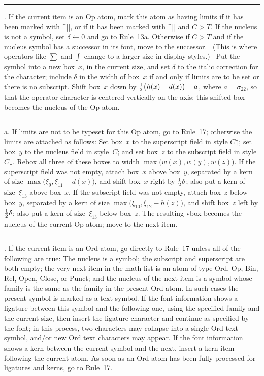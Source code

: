 \rule 13. If the current item is an Op atom, mark this atom as having
limits if it has been marked with ^|\limits|, or if it has been marked
with ^|\displaylimits| and $C>T$.  If the nucleus is not a symbol, set
$\delta\leftarrow0$ and go to Rule~13a. Otherwise if $C>T$ and if the
nucleus symbol has a successor in its font, move to the successor. \ (This
is where operators like $\sum$ and $\int$ change to a larger size in
display styles.) \ Put the symbol into a new box~$x$, in the current size,
and set $\delta$ to the italic correction for the character; include $\delta$
in the width of box~$x$ if and only if limits are to be set or
there is no subscript. Shift box~$x$ down by ${1\over2}\bigl(h(x)-d(x)\bigr)
-a$, where $a=\sigma_{22}$, so that the operator character is centered
vertically on the axis; this shifted box becomes the nucleus of the Op atom.

\rule 13a. If limits are not to be typeset for this Op atom, go to
Rule~17; otherwise the limits are attached as follows:
Set box~$x$ to the superscript field in style $C\mathord\uparrow$; set box~$y$
to the nucleus field in style~$C$; and set box~$z$ to the subscript field
in style $C\mathord\downarrow$. Rebox all three of these boxes to width
$\max\bigl(w(x),w(y),w(z)\bigr)$.  If the superscript field was not empty,
attach box~$x$ above box~$y$, separated by a kern of size
$\max\bigl(\xi_9,\xi_{11}-d(x)\bigr)$, and shift box~$x$ right by
${1\over2}\delta$; also put a kern of size~$\xi_{13}$ above box~$x$.
If the subscript field was not empty,
attach box~$z$ below box~$y$, separated by a kern of size
$\max\bigl(\xi_{10},\xi_{12}-h(z)\bigr)$, and shift box~$z$ left by
${1\over2}\delta$; also put a kern of size~$\xi_{13}$ below box~$z$.
The resulting vbox becomes the nucleus of the current Op atom; move to
the next item.

\rule 14. If the current item is an Ord atom, go directly to Rule~17 unless
all of the following are true: The nucleus is a symbol; the subscript
and superscript are both empty; the very next item in the math list is an
atom of type Ord, Op, Bin, Rel, Open, Close, or Punct; and the nucleus of the
next item is a symbol whose family is the same as the family in the present
Ord atom. In such cases the present symbol is marked as a text symbol.
If the font information shows a ligature between this symbol and the
following one, using the specified family and the current size, then
insert the ligature character and continue as specified by the font;
in this process, two characters may collapse into a single Ord
text symbol, and/or new Ord text characters may appear. If the font information
shows a kern between the current symbol and the next, insert a kern item
following the current atom.
As soon as an Ord atom has been fully processed for ligatures and kerns,
go to Rule~17.

